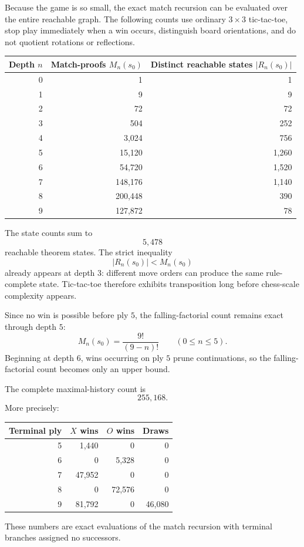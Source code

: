 \documentclass[11pt]{article}
\theoremstyle{definition}
\theoremstyle{remark}
\begin{document}
Because the game is so small, the exact match recursion can be evaluated over the entire reachable graph. The following counts use ordinary $3\times3$ tic-tac-toe, stop play immediately when a win occurs, distinguish board orientations, and do not quotient rotations or reflections.

\begin{center}
\renewcommand{\arraystretch}{1.12}
\begin{tabular}{r r r}
\toprule
Depth $n$ & Match-proofs $M_n(s_0)$ & Distinct reachable states $|R_n(s_0)|$ \\
\midrule
0 & 1 & 1 \\
1 & 9 & 9 \\
2 & 72 & 72 \\
3 & 504 & 252 \\
4 & 3,024 & 756 \\
5 & 15,120 & 1,260 \\
6 & 54,720 & 1,520 \\
7 & 148,176 & 1,140 \\
8 & 200,448 & 390 \\
9 & 127,872 & 78 \\
\bottomrule
\end{tabular}
\end{center}

The state counts sum to
\[
\boxed{5,478}
\]
reachable theorem states. The strict inequality
\[
|R_n(s_0)|<M_n(s_0)
\]
already appears at depth $3$: different move orders can produce the same rule-complete state. Tic-tac-toe therefore exhibits transposition long before chess-scale complexity appears.

Since no win is possible before ply $5$, the falling-factorial count remains exact through depth $5$:
\[
M_n(s_0)=\frac{9!}{(9-n)!}
\qquad(0\le n\le5).
\]
Beginning at depth $6$, wins occurring on ply $5$ prune continuations, so the falling-factorial count becomes only an upper bound.

The complete maximal-history count is
\[
\boxed{255,168}.
\]
More precisely:
\begin{center}
\renewcommand{\arraystretch}{1.12}
\begin{tabular}{r r r r}
\toprule
Terminal ply & $X$ wins & $O$ wins & Draws \\
\midrule
5 & 1,440 & 0 & 0 \\
6 & 0 & 5,328 & 0 \\
7 & 47,952 & 0 & 0 \\
8 & 0 & 72,576 & 0 \\
9 & 81,792 & 0 & 46,080 \\
\bottomrule
\end{tabular}
\end{center}
These numbers are exact evaluations of the match recursion with terminal branches assigned no successors.
\end{document}
